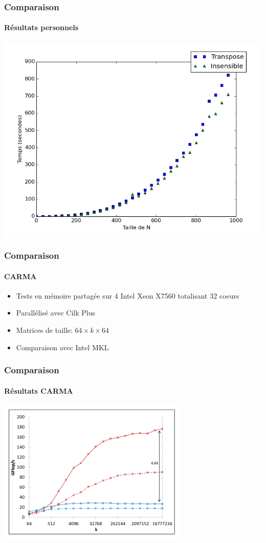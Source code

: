 \documentclass{beamer}
\begin{document}
\begin{frame}
\frametitle{Comparaison}
\framesubtitle{Résultats personnels}
\begin{center}
\colorbox{white}{\includegraphics[scale=0.4]{matmult.png}}
\end{center}
\end{frame}

\begin{frame}
\frametitle{Comparaison}
\framesubtitle{CARMA}
\begin{itemize}
\item Tests en mémoire partagée sur 4 Intel Xeon X7560 totalisant 32 coeurs
\item Parallélisé avec Cilk Plus
\item Matrices de taille: $64 \times k \times 64$
\item Comparaison avec Intel MKL
\end{itemize}
\end{frame}

\begin{frame}
\frametitle{Comparaison}
\framesubtitle{Résultats CARMA}
\begin{center}
\colorbox{white}{\includegraphics[scale=0.9]{CARMA.png}}
\end{center}
\end{frame}
\end{document}
